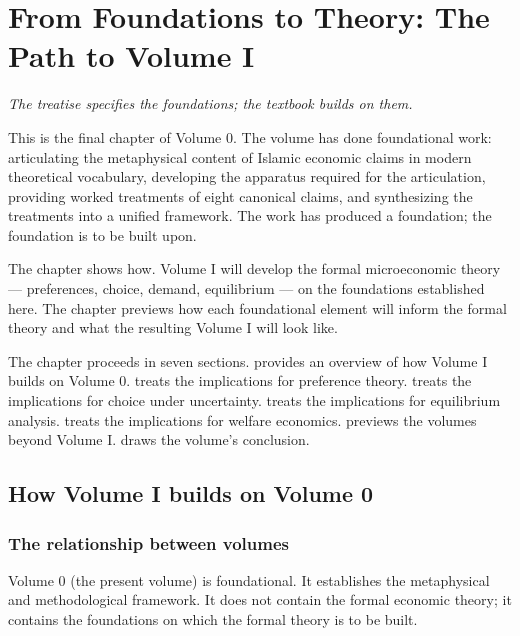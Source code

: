 \chapter{From Foundations to Theory: The Path to Volume I}
\label{ch:to-volume-1}

\epigraph{\itshape The treatise specifies the foundations; the
textbook builds on them.}{}

\noindent
This is the final chapter of Volume 0. The volume has done
foundational work: articulating the metaphysical content of
Islamic economic claims in modern theoretical vocabulary,
developing the apparatus required for the articulation, providing
worked treatments of eight canonical claims, and synthesizing the
treatments into a unified framework. The work has produced a
foundation; the foundation is to be built upon.

The chapter shows how. Volume I will develop the formal
microeconomic theory --- preferences, choice, demand, equilibrium
--- on the foundations established here. The chapter previews how
each foundational element will inform the formal theory and what
the resulting Volume I will look like.

The chapter proceeds in seven sections. 
provides an overview of how Volume I builds on Volume 0.
 treats the implications for
preference theory.  treats the
implications for choice under uncertainty.
 treats the implications for
equilibrium analysis.  treats the
implications for welfare economics. 
previews the volumes beyond Volume I. 
draws the volume's conclusion.

\section{How Volume I builds on Volume 0}
\label{sec:to-vol1-overview}

\subsection{The relationship between volumes}

Volume 0 (the present volume) is foundational. It establishes the
metaphysical and methodological framework. It does not contain
the formal economic theory; it contains the foundations on which
the formal theory is to be built.

